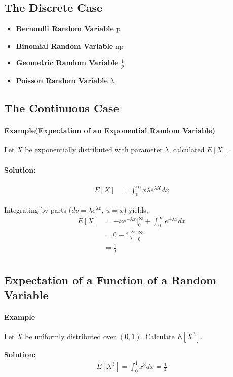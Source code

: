 \documentclass[10 pt,final]{article}
\begin{document}
\subsection{The Discrete Case}
\begin{itemize}
\item \textbf{Bernoulli Random Variable} p
\item \textbf{Binomial Random Variable} np
\item \textbf{Geometric Random Variable} $\frac{1}{p}$
\item \textbf{Poisson Random Variable} $\lambda$
\end{itemize}

\subsection{The Continuous Case}
\paragraph{Example(Expectation of an Exponential Random Variable)} Let $X$ be exponentially distributed with parameter $\lambda$, calculated $E[X]$. 
\paragraph{Solution:} 
\begin{align*}
E[X] & = \int_0^{\infty} x \lambda e^{\lambda X} dx 
\end{align*}

Integrating by parts ($dv = \lambda e^{\lambda x}$, $u=x$) yields, 
\begin{align*}
E[X] & = -x e^{-\lambda x}|^{\infty}_{0} + \int_0^{\infty} e^{-\lambda x} dx \\
& = 0 - \frac{e^{-\lambda x}}{\lambda}|^\infty_{0}\\
& = \frac{1}{\lambda} \\
\end{align*}

\subsection{Expectation of a Function of a Random Variable}
\paragraph{Example} Let $X$ be uniformly distributed over $(0,1)$. Calculate $E[X^3]$.

\textbf{Solution:}
\begin{align*}
E[X^3] = \int_0^{1} x^3 dx = \frac{1}{4}
\end{align*}
\end{document}

